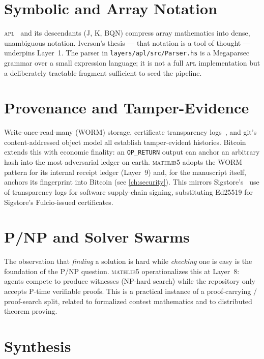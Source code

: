 \section{Symbolic and Array Notation}
\label{sec:rw-apl}

\textsc{apl}~\cite{apl} and its descendants (J, K, BQN) compress array
mathematics into dense, unambiguous notation. Iverson's thesis --- that
notation is a tool of thought --- underpins Layer~1. The parser in
\texttt{layers/apl/src/Parser.hs} is a Megaparsec grammar over a small
expression language; it is not a full \textsc{apl} implementation but a
deliberately tractable fragment sufficient to seed the pipeline.

\section{Provenance and Tamper-Evidence}
\label{sec:rw-provenance}

Write-once-read-many (WORM) storage, certificate transparency
logs~\cite{ct}, and git's content-addressed object model all establish
tamper-evident histories. Bitcoin~\cite{bitcoin} extends this with
economic finality: an \texttt{OP\_RETURN} output can anchor an arbitrary
hash into the most adversarial ledger on earth. \textsc{mathlib5} adopts the
WORM pattern for its internal receipt ledger (Layer~9) and, for the
manuscript itself, anchors its fingerprint into Bitcoin (see
\cref{ch:security}). This mirrors Sigstore's~\cite{sigstore} use of
transparency logs for software supply-chain signing, substituting Ed25519 for
Sigstore's Fulcio-issued certificates.

\section{P/NP and Solver Swarms}
\label{sec:rw-pnp}

The observation that \emph{finding} a solution is hard while \emph{checking}
one is easy is the foundation of the P/NP question. \textsc{mathlib5}
operationalizes this at Layer~8: agents compete to produce witnesses
(NP-hard search) while the repository only accepts P-time verifiable proofs.
This is a practical instance of a proof-carrying / proof-search split, related
to formalized contest mathematics and to distributed theorem proving.

\section{Synthesis}
\label{sec:rw-synthesis}

